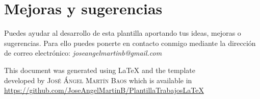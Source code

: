 \documentclass[11pt]{article}
\newif\ifspanish %
\begin{document}
\section{Mejoras y sugerencias}
Puedes ayudar al desarrollo de esta plantilla aportando tus ideas, mejoras o sugerencias. Para ello puedes ponerte en contacto conmigo mediante la dirección de correo electrónico: \emph{joseangelmartinb@gmail.com}



\newpage



\ifspanish
	\addcontentsline{toc}{section}{Referencias}
\else
\fi



\null\vfill
\begin{center}
\ifspanish
	Este documento ha sido generado con \LaTeX{} utilizando la plantilla\\
	desarrollada por \textsc{José Ángel Martín Baos} y disponible en\\
	\url{https://github.com/JoseAngelMartinB/PlantillaTrabajosLaTeX}
\else
	This document was generated using \LaTeX{} and the template\\
	developed by \textsc{José Ángel Martín Baos} which is available in\\
	\url{https://github.com/JoseAngelMartinB/PlantillaTrabajosLaTeX}
\fi
\end{center}
\end{document}

